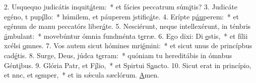 2. Usquequo judicátis inquit\uline{á}tem:~* et fácies peccatrum súm\uline{i}tis?
3. Judicáte egéno, t pup\uline{í}llo:~* húmilem, et páuperem jstific\uline{á}te.
4. Erípte p\uline{áu}perem:~* et egénum de manu peccatórs liber\uline{á}te.
5. Nesciérunt, neque intellexérunt, in ténbris \uline{á}mbulant:~* movebúntur ómnia fundménta t\uline{e}rræ.
6. Ego dixi: Di \uline{e}stis,~* et fílii xcélsi \uline{o}mnes.
7. Vos autem sicut hómines mri\uline{é}mini:~* et sicut unus de princípbus cad\uline{é}tis.
8. Surge, Deus, júdca t\uline{e}rram:~* quóniam tu hereditábis in ómnbus Gént\uline{i}bus.
9. Glória Patr, et F\uline{í}lio,~* et Spirtui S\uline{a}ncto.
10. Sicut erat in princípio, et nnc, et s\uline{e}mper,~* et in sǽcula sæclórum. \uline{A}men.
